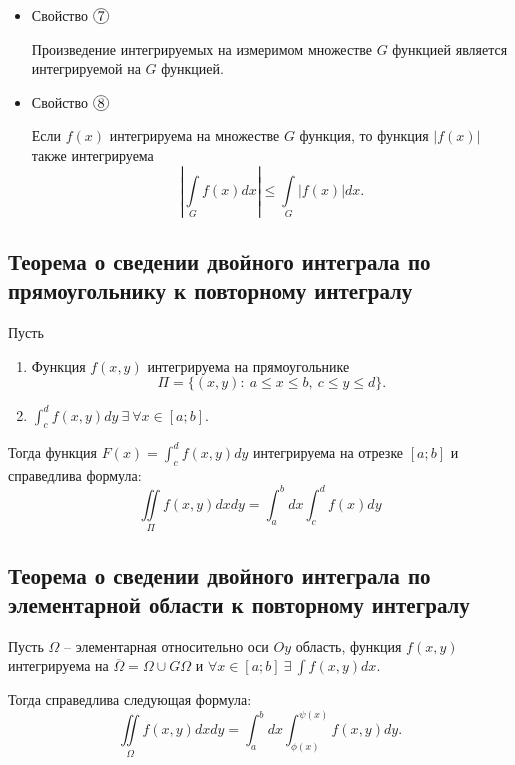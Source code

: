 \begin{itemize}
    \item Свойство $ \circled{7} $
          \begin{statement}
              Произведение интегрируемых на измеримом множестве $ G $ функцией является интегрируемой на $ G $ функцией.
          \end{statement}

    \item Свойство $ \circled{8} $
          \begin{statement}
              Если $ f(x) $ интегрируема на множестве $ G $ функция, то функция $ \big| f(x) \big| $ также интегрируема
              \[
                  \left|\underset{G}{\int}f(x)dx\right| \leqslant \underset{G}{\int}\big|f(x)\big|dx.
              \]
          \end{statement}
\end{itemize}

\newpage

\subsection{Теорема о сведении двойного интеграла по прямоугольнику к повторному интегралу}

\begin{theorem}
    Пусть
    \begin{enumerate}
        \item Функция $ f(x,y) $ интегрируема на прямоугольнике
              \[
                  \Pi = \big\{(x,y): \ a \leqslant x \leqslant b, \ c \leqslant y \leqslant d\big\}.
              \]

        \item $ \int_{c}^{d}f(x,y)dy \ \exists \ \forall x \in [a;b] $.
    \end{enumerate}

    Тогда функция $ F(x) = \int_{c}^{d}f(x,y)dy $ интегрируема на отрезке $ [a;b] $ и справедлива формула:
    \[
        \boxed{\iint\limits_\Pi f(x,y)dxdy = \int_{a}^{b}dx \int_{c}^{d}f(x)dy}
    \]
\end{theorem}

\subsection{Теорема о сведении двойного интеграла по элементарной области к повторному интегралу}

\begin{theorem}
    Пусть $ \Omega $ -- элементарная относительно оси $ Oy $ область, функция $ f(x,y) $ интегрируема на $ \overline{\Omega} = \Omega \cup G\Omega $ и $ \forall x \in [a;b] \ \exists \ \int f(x,y)dx $.

    Тогда справедлива следующая формула:
    \begin{equation}\label{eq:for_proof9}
        \iint\limits_\Omega f(x,y)dxdy = \int_{a}^{b}dx \int_{\phi(x)}^{\psi(x)}f(x,y)dy.
    \end{equation}
\end{theorem}

